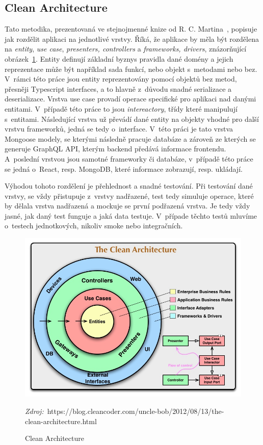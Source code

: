 \subsection{Clean Architecture}
\label{ss:clean_architecture}
Tato metodika, prezentovaná ve stejnojmenné knize od R. C. Martina~\cite{martin_2018_clean}, popisuje jak rozdělit aplikaci na jednotlivé vrstvy. Říká, že aplikace by měla být rozdělena na \emph{entity}, \emph{use case}, \emph{presenters, controllers} a \emph{frameworks, drivers}, znázorňující obrázek~\ref{fig:clean_architecture}.
Entity definují základní byznys pravidla dané domény a jejich reprezentace může být například sada funkcí, nebo objekt s~metodami nebo bez. V~rámci této práce jsou entity reprezentovány pomocí objektů bez metod, přesněji Typescript interfaces, a to hlavně z~důvodu snadné serializace a deserializace.
Vrstva use case provadí operace specifické pro aplikaci nad danými entitami. V~případě této práce to jsou \emph{intereactory}, třídy které manipulují s~entitami.
Následující vrstva už převádí dané entity na objekty vhodné pro další vrstvu frameworků, jedná se tedy o~interface. V~této práci je tato vrstva Mongoose modely, se kterými následně pracuje databáze a zároveň ze kterých se generuje GraphQL API, kterým backend předává informace frontendu. A~poslední vrstvou jsou samotné frameworky či databáze, v~případě této práce se jedná o~React, resp. MongoDB, které informace zobrazují, resp. ukládají.

Výhodou tohoto rozdělení je přehlednost a snadné testování. Při testování dané vrstvy, se vždy přistupuje z~vrstvy nadřazené, test tedy simuluje operace, které by dělala vrstva nadřazená a mockuje se první podřazená vrstva. Je tedy vždy jasné, jak daný test funguje a jaká data testuje. V~případe těchto testů mluvíme o~testech jednotkových, nikoliv smoke nebo integračních.

\begin{figure}
    \centering
    \includegraphics[width=\textwidth]{assets/clean_architecture.jpg}
    \caption{Clean Architecture}
    \label{fig:clean_architecture}
    \textit{Zdroj:}~https://blog.cleancoder.com/uncle-bob/2012/08/13/the-clean-architecture.html
\end{figure}
